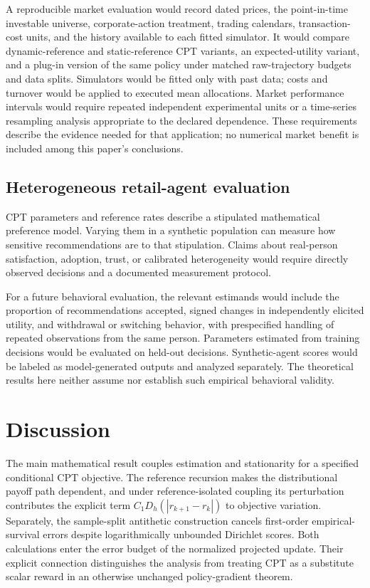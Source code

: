 \documentclass[11pt]{article}
\newcommand{\1}{\mathbf 1}
\begin{document}
A reproducible market evaluation would record dated prices, the point-in-time investable universe, corporate-action treatment, trading calendars, transaction-cost units, and the history available to each fitted simulator. It would compare dynamic-reference and static-reference CPT variants, an expected-utility variant, and a plug-in version of the same policy under matched raw-trajectory budgets and data splits. Simulators would be fitted only with past data; costs and turnover would be applied to executed mean allocations. Market performance intervals would require repeated independent experimental units or a time-series resampling analysis appropriate to the declared dependence. These requirements describe the evidence needed for that application; no numerical market benefit is included among this paper's conclusions.

\subsection{Heterogeneous retail-agent evaluation}
CPT parameters and reference rates describe a stipulated mathematical preference model. Varying them in a synthetic population can measure how sensitive recommendations are to that stipulation. Claims about real-person satisfaction, adoption, trust, or calibrated heterogeneity would require directly observed decisions and a documented measurement protocol.

For a future behavioral evaluation, the relevant estimands would include the proportion of recommendations accepted, signed changes in independently elicited utility, and withdrawal or switching behavior, with prespecified handling of repeated observations from the same person. Parameters estimated from training decisions would be evaluated on held-out decisions. Synthetic-agent scores would be labeled as model-generated outputs and analyzed separately. The theoretical results here neither assume nor establish such empirical behavioral validity.

\section{Discussion}\label{sec:discussion}
The main mathematical result couples estimation and stationarity for a specified conditional CPT objective. The reference recursion makes the distributional payoff path dependent, and under reference-isolated coupling its perturbation contributes the explicit term $C_1D_h(|r_{k+1}-r_k|)$ to objective variation. Separately, the sample-split antithetic construction cancels first-order empirical-survival errors despite logarithmically unbounded Dirichlet scores. Both calculations enter the error budget of the normalized projected update. Their explicit connection distinguishes the analysis from treating CPT as a substitute scalar reward in an otherwise unchanged policy-gradient theorem.
\end{document}
